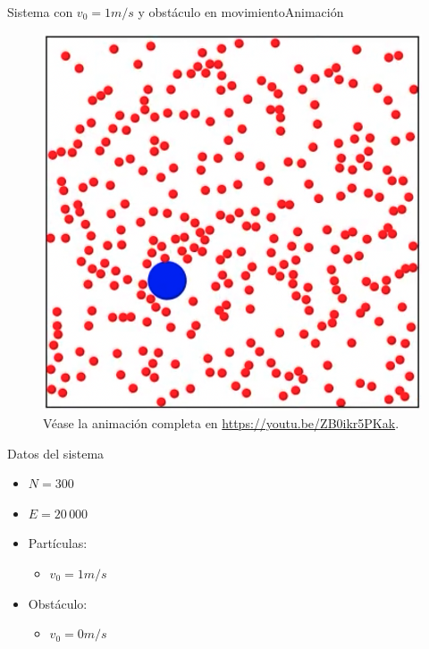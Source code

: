 \documentclass{beamer}
\begin{document}
            \begin{frame}{Sistema con $v_0=1m/s$ y obstáculo en movimiento}{Animación}
                \begin{minipage}[t]{0.60\textwidth}
                    \begin{figure}[H!]
                        \includegraphics[height=.65\textheight]{./animation_obstacle_moves_v_1}
                        \caption*{Véase la animación completa en \url{https://youtu.be/ZB0ikr5PKak}.}
                        \label{fig:a_5}
                    \end{figure}
                \end{minipage}
                \hfill
                \begin{minipage}[t]{0.30\textwidth}
                    \begin{block}{Datos del sistema}
                        \begin{itemize}
                            \item $N=300$
                            \item $E=20\,000$
                            \item Partículas:
                            \begin{itemize}
                                \item $v_0 = 1 m/s$
                            \end{itemize}
                            \item Obstáculo:
                            \begin{itemize}
                                \item $v_0 = 0 m/s$
                            \end{itemize}
                        \end{itemize}
                    \end{block}
                \end{minipage}
            \end{frame}
\end{document}
